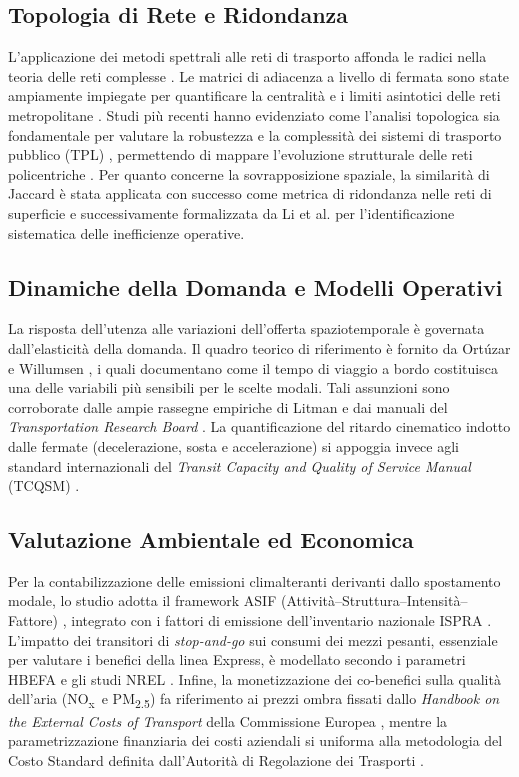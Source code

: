 \documentclass[conference]{IEEEtran}
\newcommand{\nox}{NO\textsubscript{x}}
\newcommand{\pmtwo}{PM\textsubscript{2.5}}
\begin{document}
\subsection{Topologia di Rete e Ridondanza}
L'applicazione dei metodi spettrali alle reti di trasporto affonda le radici nella teoria delle reti complesse \cite{barabasi2002}. Le matrici di adiacenza a livello di fermata sono state ampiamente impiegate per quantificare la centralità e i limiti asintotici delle reti metropolitane \cite{roth2012}. Studi più recenti hanno evidenziato come l'analisi topologica sia fondamentale per valutare la robustezza e la complessità dei sistemi di trasporto pubblico (TPL) \cite{darrick2010}, permettendo di mappare l'evoluzione strutturale delle reti policentriche \cite{cats2016, cats2017}. Per quanto concerne la sovrapposizione spaziale, la similarità di Jaccard è stata applicata con successo come metrica di ridondanza nelle reti di superficie e successivamente formalizzata da Li et al. \cite{Li2019} per l'identificazione sistematica delle inefficienze operative.

\subsection{Dinamiche della Domanda e Modelli Operativi}
La risposta dell'utenza alle variazioni dell'offerta spaziotemporale è governata dall'elasticità della domanda. Il quadro teorico di riferimento è fornito da Ortúzar e Willumsen \cite{ortuzar2011}, i quali documentano come il tempo di viaggio a bordo costituisca una delle variabili più sensibili per le scelte modali. Tali assunzioni sono corroborate dalle ampie rassegne empiriche di Litman \cite{litman2023} e dai manuali del \textit{Transportation Research Board} \cite{tcrp95_cap9}. La quantificazione del ritardo cinematico indotto dalle fermate (decelerazione, sosta e accelerazione) si appoggia invece agli standard internazionali del \textit{Transit Capacity and Quality of Service Manual} (TCQSM) \cite{TRB2013}.

\subsection{Valutazione Ambientale ed Economica}
Per la contabilizzazione delle emissioni climalteranti derivanti dallo spostamento modale, lo studio adotta il framework ASIF (Attività–Struttura–Intensità–Fattore) \cite{IEA_schipper}, integrato con i fattori di emissione dell'inventario nazionale ISPRA \cite{ispra2023}. L'impatto dei transitori di \textit{stop-and-go} sui consumi dei mezzi pesanti, essenziale per valutare i benefici della linea Express, è modellato secondo i parametri HBEFA \cite{hbefa2022} e gli studi NREL \cite{nrel_transit_stops}. Infine, la monetizzazione dei co-benefici sulla qualità dell'aria (\nox\ e \pmtwo) fa riferimento ai prezzi ombra fissati dallo \textit{Handbook on the External Costs of Transport} della Commissione Europea \cite{ec_handbook2019}, mentre la parametrizzazione finanziaria dei costi aziendali si uniforma alla metodologia del Costo Standard definita dall'Autorità di Regolazione dei Trasporti \cite{art_costi_standard_2021}.
\end{document}
